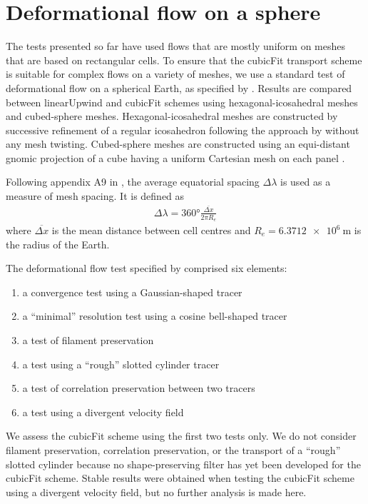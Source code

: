 \section{Deformational flow on a sphere}
\label{sec:cubicFit:deformationSphere}

The tests presented so far have used flows that are mostly uniform on meshes that are based on rectangular cells.
To ensure that the cubicFit transport scheme is suitable for complex flows on a variety of meshes, we use a standard test of deformational flow on a spherical Earth, as specified by \citet{lauritzen2012}.  
Results are compared between linearUpwind and cubicFit schemes using hexagonal-icosahedral meshes and cubed-sphere meshes.
Hexagonal-icosahedral meshes are constructed by successive refinement of a regular icosahedron following the approach by \citet{thuburn2014,heikes-randall1995a,heikes-randall1995b} without any mesh twisting.
Cubed-sphere meshes are constructed using an equi-distant gnomic projection of a cube having a uniform Cartesian mesh on each panel \citep{staniforth-thuburn2012}.

Following appendix A9 in \citet{lauritzen2014}, the average equatorial spacing $\Delta \lambda$ is used as a measure of mesh spacing.  It is defined as
\begin{align}
	\Delta \lambda = \ang{360} \frac{\overline{\Delta x}}{2 \pi R_e}
\end{align}
where $\overline{\Delta x}$ is the mean distance between cell centres and $R_e = \SI{6.3712e6}{\meter}$ is the radius of the Earth.

The deformational flow test specified by \citet{lauritzen2012} comprised six elements:
\begin{enumerate}
\item a convergence test using a Gaussian-shaped tracer
\item a ``minimal'' resolution test using a cosine bell-shaped tracer
\item a test of filament preservation
\item a test using a ``rough'' slotted cylinder tracer
\item a test of correlation preservation between two tracers
\item a test using a divergent velocity field
\end{enumerate}
We assess the cubicFit scheme using the first two tests only.  We do not consider filament preservation, correlation preservation, or the transport of a ``rough'' slotted cylinder because no shape-preserving filter has yet been developed for the cubicFit scheme.  Stable results were obtained when testing the cubicFit scheme using a divergent velocity field, but no further analysis is made here.

